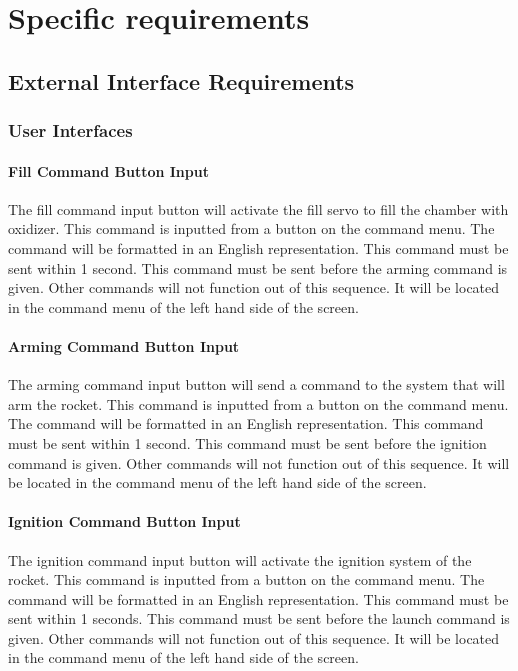 \documentclass[10pt,draftclsnofoot,onecolumn,retainorgcmds]{IEEEtran}
\begin{document}
\section{ Specific requirements}
\subsection{External Interface Requirements}
\subsubsection{ User Interfaces}
\paragraph {\bf Fill Command Button Input}
The fill command input button will activate the fill servo to fill the chamber with oxidizer. This command is inputted from a button on the command menu. The command will be formatted in an English representation.  This command must be sent within 1 second. This command must be sent before the arming command is given. Other commands will not function out of this sequence. It will be located in the command menu of the left hand side of the screen.

\paragraph{\bf Arming Command Button Input}
The arming command input button will send a command to the system that will arm the rocket. This command is inputted from a button on the command menu. The command will be formatted in an English representation.  This command must be sent within 1 second. This command must be sent before the ignition command is given. Other commands will not function out of this sequence. It will be located in the command menu of the left hand side of the screen.

\paragraph{\bf Ignition Command Button Input}
The ignition command input button will activate the ignition system of the rocket. This command is inputted from a button on the command menu. The command will be formatted in an English representation.  This command must be sent within 1 seconds. This command must be sent before the launch command is given. Other commands will not function out of this sequence. It will be located in the command menu of the left hand side of the screen.
\end{document}
